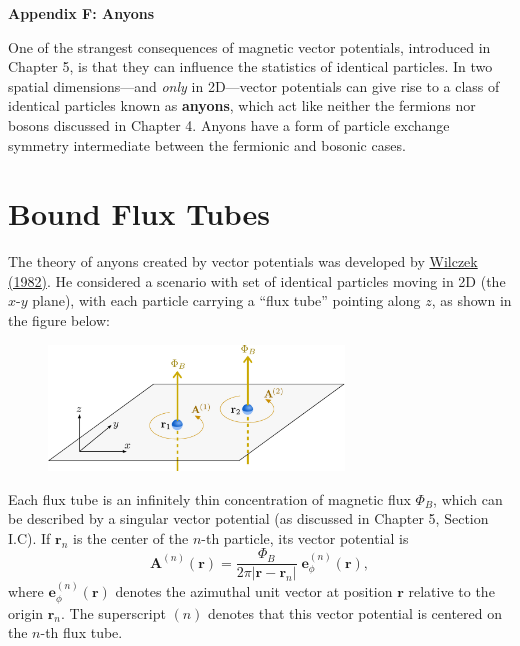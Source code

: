 \documentclass[pra,12pt]{revtex4}
\begin{document}
\begin{center}
{\large \textbf{Appendix F: Anyons}}
\end{center}

One of the strangest consequences of magnetic vector potentials,
introduced in Chapter 5, is that they can influence the statistics of
identical particles.  In two spatial dimensions---and \textit{only} in
2D---vector potentials can give rise to a class of identical particles
known as \textbf{anyons}, which act like neither the fermions nor
bosons discussed in Chapter 4.  Anyons have a form of particle
exchange symmetry intermediate between the fermionic and
bosonic cases.

\section{Bound Flux Tubes}

The theory of anyons created by vector potentials was developed by
\hyperref[cite:wilczek]{Wilczek (1982)}.  He considered a scenario
with set of identical particles moving in 2D (the $x$-$y$ plane), with
each particle carrying a ``flux tube'' pointing along $z$, as shown in
the figure below:

\begin{figure}[h]
  \centering\includegraphics[width=0.7\textwidth]{anyons}
\end{figure}

Each flux tube is an infinitely thin concentration of magnetic flux
$\Phi_B$, which can be described by a singular vector potential (as
discussed in Chapter 5, Section I.C).  If $\mathbf{r}_n$ is the center
of the $n$-th particle, its vector potential is
\begin{equation}
  \mathbf{A}^{(n)}(\mathbf{r}) = \frac{\Phi_B}{2\pi
    |\mathbf{r}-\mathbf{r}_n|} \; \mathbf{e}_\phi^{(n)}(\mathbf{r}),
  \label{Asolenoid}
\end{equation}
where $\mathbf{e}_\phi^{(n)}(\mathbf{r})$ denotes the azimuthal unit
vector at position $\mathbf{r}$ relative to the origin $\mathbf{r}_n$.
The superscript $(n)$ denotes that this vector potential is centered
on the $n$-th flux tube.
\end{document}
